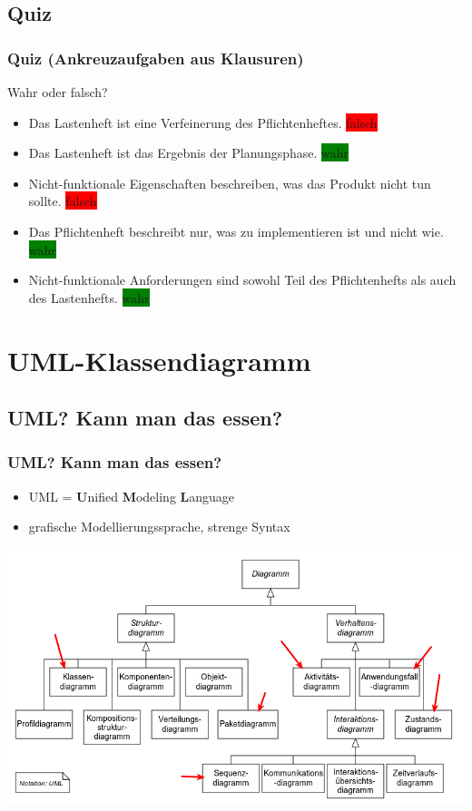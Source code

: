 \documentclass[18pt]{beamer}
\begin{document}
	\subsection{Quiz}
	\begin{frame}
		\frametitle{Quiz (Ankreuzaufgaben aus Klausuren)}
		Wahr oder falsch?
		\begin{itemize}
			\item Das Lastenheft ist eine Verfeinerung des Pflichtenheftes. \pause \colorbox{red}{falsch} \pause
			\item Das Lastenheft ist das Ergebnis der Planungsphase. \pause \colorbox{green}{wahr} \pause
			\item Nicht-funktionale Eigenschaften beschreiben, was das Produkt nicht tun sollte. \pause \colorbox{red}{falsch} \pause 
			\item Das Pflichtenheft beschreibt nur, was zu implementieren ist und nicht wie. \pause \colorbox{green}{wahr} \pause 
			\item Nicht-funktionale Anforderungen sind sowohl Teil des Pflichtenhefts als auch des Lastenhefts. \pause \colorbox{green}{wahr}
		\end{itemize}
		
	\end{frame}

\section{UML-Klassendiagramm}
	\subsection{UML? Kann man das essen?}
	\begin{frame}
		\frametitle{UML? Kann man das essen?}
		\begin{itemize}
			\item UML = \textbf{U}nified \textbf{M}odeling \textbf{L}anguage
			\item grafische Modellierungssprache, strenge Syntax
		\end{itemize}
		\includegraphics[scale=0.35]{./pics/tut1/uml_diagrams.png}
	\end{frame}	
	
\end{document}
